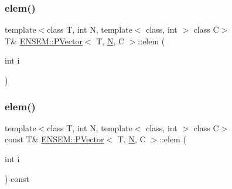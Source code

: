 \subsubsection{\texorpdfstring{elem()}{elem()}\hspace{0.1cm}{\footnotesize\ttfamily [3/6]}}
{\footnotesize\ttfamily template$<$class T, int N, template$<$ class, int $>$ class C$>$ \\
T\& \mbox{\hyperlink{classENSEM_1_1PVector}{E\+N\+S\+E\+M\+::\+P\+Vector}}$<$ T, \mbox{\hyperlink{adat__devel_2lib_2hadron_2operator__name__util_8cc_a7722c8ecbb62d99aee7ce68b1752f337}{N}}, C $>$\+::elem (\begin{DoxyParamCaption}\item[{int}]{i }\end{DoxyParamCaption})\hspace{0.3cm}{\ttfamily [inline]}}

\mbox{\label{classENSEM_1_1PVector_a7c7ccc3b772ecddfeb58bb552ffcdbb9}} 
\subsubsection{\texorpdfstring{elem()}{elem()}\hspace{0.1cm}{\footnotesize\ttfamily [4/6]}}
{\footnotesize\ttfamily template$<$class T, int N, template$<$ class, int $>$ class C$>$ \\
const T\& \mbox{\hyperlink{classENSEM_1_1PVector}{E\+N\+S\+E\+M\+::\+P\+Vector}}$<$ T, \mbox{\hyperlink{adat__devel_2lib_2hadron_2operator__name__util_8cc_a7722c8ecbb62d99aee7ce68b1752f337}{N}}, C $>$\+::elem (\begin{DoxyParamCaption}\item[{int}]{i }\end{DoxyParamCaption}) const\hspace{0.3cm}{\ttfamily [inline]}}

\mbox{\label{classENSEM_1_1PVector_a7c7ccc3b772ecddfeb58bb552ffcdbb9}} 

